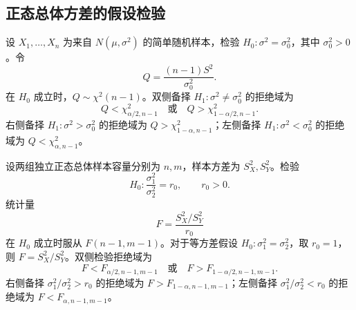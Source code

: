 \documentclass[11pt,a4paper,fontset=fandol]{ctexart}
\theoremstyle{remark}
\begin{document}
\subsection{正态总体方差的假设检验}
设 $X_1,\ldots,X_n$ 为来自 $N(\mu,\sigma^2)$ 的简单随机样本，检验 $H_0:\sigma^2=\sigma_0^2$，其中 $\sigma_0^2>0$。令
\[
    Q=\frac{(n-1)S^2}{\sigma_0^2}.
\]
在 $H_0$ 成立时，$Q\sim\chi^2(n-1)$。双侧备择 $H_1:\sigma^2\ne\sigma_0^2$ 的拒绝域为
\[
    Q<\chi^2_{\alpha/2,n-1}
    \quad\text{或}\quad
    Q>\chi^2_{1-\alpha/2,n-1}.
\]
右侧备择 $H_1:\sigma^2>\sigma_0^2$ 的拒绝域为 $Q>\chi^2_{1-\alpha,n-1}$；左侧备择 $H_1:\sigma^2<\sigma_0^2$ 的拒绝域为 $Q<\chi^2_{\alpha,n-1}$。

设两组独立正态总体样本容量分别为 $n,m$，样本方差为 $S_X^2,S_Y^2$。检验
\[
    H_0:\frac{\sigma_1^2}{\sigma_2^2}=r_0,\qquad r_0>0.
\]
统计量
\[
    F=\frac{S_X^2/S_Y^2}{r_0}
\]
在 $H_0$ 成立时服从 $F(n-1,m-1)$。对于等方差假设 $H_0:\sigma_1^2=\sigma_2^2$，取 $r_0=1$，则 $F=S_X^2/S_Y^2$。双侧检验拒绝域为
\[
    F<F_{\alpha/2,n-1,m-1}
    \quad\text{或}\quad
    F>F_{1-\alpha/2,n-1,m-1}.
\]
右侧备择 $\sigma_1^2/\sigma_2^2>r_0$ 的拒绝域为 $F>F_{1-\alpha,n-1,m-1}$；左侧备择 $\sigma_1^2/\sigma_2^2<r_0$ 的拒绝域为 $F<F_{\alpha,n-1,m-1}$。
\end{document}

